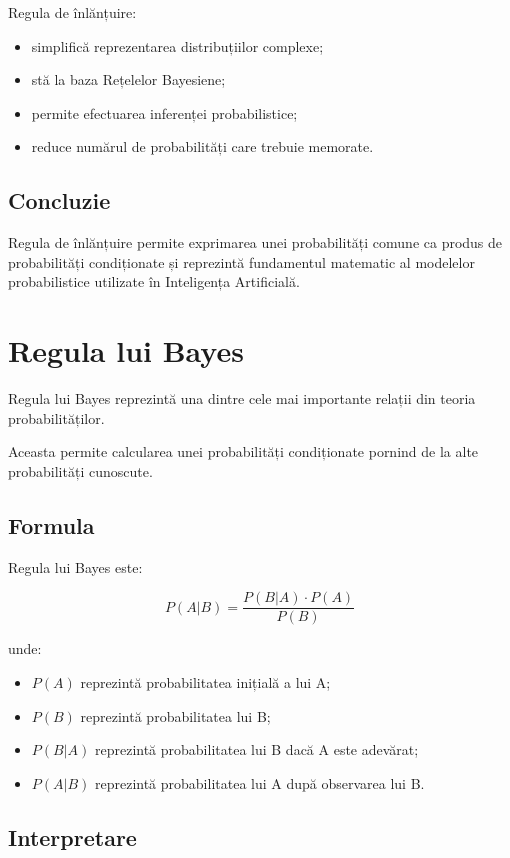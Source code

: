 \documentclass[12pt,a4paper]{article}
\begin{document}
Regula de înlănțuire:

\begin{itemize}
\item simplifică reprezentarea distribuțiilor complexe;
\item stă la baza Rețelelor Bayesiene;
\item permite efectuarea inferenței probabilistice;
\item reduce numărul de probabilități care trebuie memorate.
\end{itemize}

\subsection{Concluzie}

Regula de înlănțuire permite exprimarea unei probabilități comune ca produs de probabilități condiționate și reprezintă fundamentul matematic al modelelor probabilistice utilizate în Inteligența Artificială.




\section{Regula lui Bayes}

Regula lui Bayes reprezintă una dintre cele mai importante relații din teoria probabilităților.

Aceasta permite calcularea unei probabilități condiționate pornind de la alte probabilități cunoscute.

\subsection{Formula}

Regula lui Bayes este:

\[
P(A|B)
=
\frac
{P(B|A)\cdot P(A)}
{P(B)}
\]

unde:

\begin{itemize}
\item $P(A)$ reprezintă probabilitatea inițială a lui A;
\item $P(B)$ reprezintă probabilitatea lui B;
\item $P(B|A)$ reprezintă probabilitatea lui B dacă A este adevărat;
\item $P(A|B)$ reprezintă probabilitatea lui A după observarea lui B.
\end{itemize}

\subsection{Interpretare}
\end{document}

